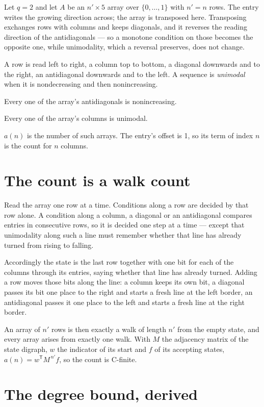 \documentclass[11pt]{article}
\theoremstyle{definition}
\begin{document}
Let $q = 2$ and let $A$ be an $n' \times 5$ array over $\{0,\dots,1\}$ with $n' = n$ rows. The entry writes the growing direction across; the array is transposed here. Transposing exchanges rows with columns and keeps diagonals, and it reverses the reading direction of the antidiagonals --- so a monotone condition on those becomes the opposite one, while unimodality, which a reversal preserves, does not change.

A row is read left to right, a column top to bottom, a diagonal downwards and to the right, an antidiagonal downwards and to the left. A sequence is {\itshape unimodal} when it is nondecreasing and then nonincreasing.

Every one of the array's antidiagonals is nonincreasing.

Every one of the array's columns is unimodal.

$a(n)$ is the number of such arrays. The entry's offset is 1, so its term of index $n$ is the count for $n$ columns.

\section{The count is a walk count}

Read the array one row at a time. Conditions along a row are decided by that row alone. A condition along a column, a diagonal or an antidiagonal compares entries in consecutive rows, so it is decided one step at a time --- except that unimodality along such a line must remember whether that line has already turned from rising to falling.

Accordingly the state is the last row together with one bit for each of the columns through its entries, saying whether that line has already turned. Adding a row moves those bits along the line: a column keeps its own bit, a diagonal passes its bit one place to the right and starts a fresh line at the left border, an antidiagonal passes it one place to the left and starts a fresh line at the right border.

An array of $n'$ rows is then exactly a walk of length $n'$ from the empty state, and every array arises from exactly one walk. With $M$ the adjacency matrix of the state digraph, $w$ the indicator of its start and $f$ of its accepting states, $a(n) = w^{\mathsf T}M^{\,n'}f$, so the count is C-finite.

\section{The degree bound, derived}
\end{document}
